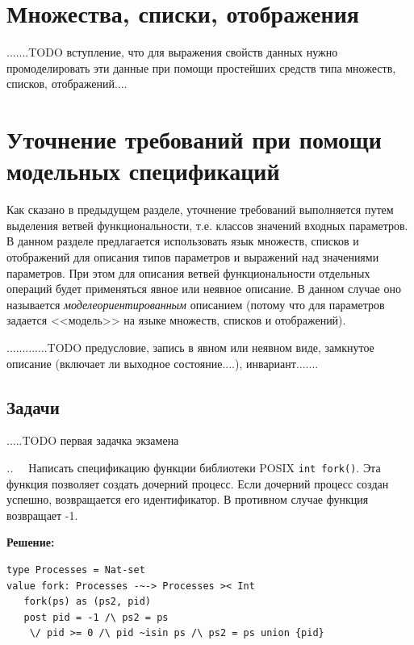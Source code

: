 \documentclass[14pt, twoside]{extreport}
\newcounter{problem_type}[chapter]
\newcounter{zadacha}[problem_type]
\newcommand{\z}{\vspace{0.5cm}\par\addtocounter{zadacha}{1}%
\textit{\arabic{chapter}.\arabic{problem_type}.\arabic{zadacha}}~~  }
\newcommand{\head}[1]{\vspace{1cm}\subsubsection*{#1}}
\newcommand{\zhead}[1]{\head{#1} \refstepcounter{problem_type}}
\begin{document}
\section{Множества, списки, отображения}

.......TODO вступление, что для выражения свойств данных нужно промоделировать эти данные при помощи простейших средств типа множеств, списков, отображений....


\section{Уточнение требований при помощи модельных спецификаций}

Как сказано в предыдущем разделе, уточнение требований выполняется путем выделения ветвей функциональности, т.е. классов значений входных параметров. В данном разделе предлагается использовать язык множеств, списков и отображений для описания типов параметров и выражений над значениями параметров. При этом для описания ветвей функциональности отдельных операций будет применяться явное или неявное описание. В данном случае оно называется \emph{моделеориентированным} описанием (потому что для параметров задается <<модель>> на языке множеств, списков и отображений).


.............TODO предусловие, запись в явном или неявном виде, замкнутое описание (включает ли выходное состояние....), инвариант.......


\subsection*{Задачи}
.....TODO первая задачка экзамена


\z Написать спецификацию функции библиотеки POSIX \texttt{int fork()}. Эта функция позволяет создать дочерний процесс. Если дочерний процесс создан успешно, возвращается его идентификатор. В противном случае функция возвращает -1.

\textbf{Решение:}
\begin{lstlisting}
type Processes = Nat-set
value fork: Processes -~-> Processes >< Int
   fork(ps) as (ps2, pid)
   post pid = -1 /\ ps2 = ps
   	\/ pid >= 0 /\ pid ~isin ps /\ ps2 = ps union {pid}
\end{lstlisting}
\end{document}
